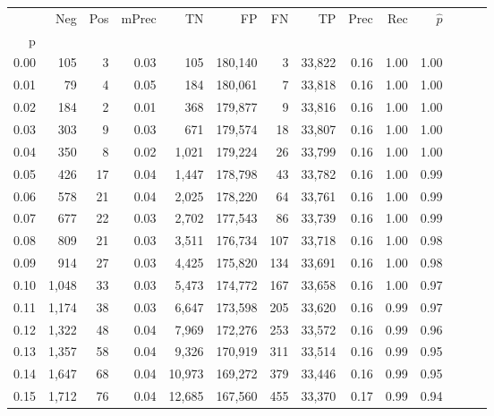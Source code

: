 \begin{tabular}{rrrrrrrrrrrrrr}
\toprule
{} &    Neg &  Pos & mPrec &       TN &       FP &      FN &      TP &  Prec &   Rec & $\hat{p}$ \\
p    &        &      &       &          &          &         &         &       &       &           \\
\midrule
0.00 &    105 &    3 &  0.03 &      105 &  180,140 &       3 &  33,822 &  0.16 &  1.00 &      1.00 \\
0.01 &     79 &    4 &  0.05 &      184 &  180,061 &       7 &  33,818 &  0.16 &  1.00 &      1.00 \\
0.02 &    184 &    2 &  0.01 &      368 &  179,877 &       9 &  33,816 &  0.16 &  1.00 &      1.00 \\
0.03 &    303 &    9 &  0.03 &      671 &  179,574 &      18 &  33,807 &  0.16 &  1.00 &      1.00 \\
0.04 &    350 &    8 &  0.02 &    1,021 &  179,224 &      26 &  33,799 &  0.16 &  1.00 &      1.00 \\
0.05 &    426 &   17 &  0.04 &    1,447 &  178,798 &      43 &  33,782 &  0.16 &  1.00 &      0.99 \\
0.06 &    578 &   21 &  0.04 &    2,025 &  178,220 &      64 &  33,761 &  0.16 &  1.00 &      0.99 \\
0.07 &    677 &   22 &  0.03 &    2,702 &  177,543 &      86 &  33,739 &  0.16 &  1.00 &      0.99 \\
0.08 &    809 &   21 &  0.03 &    3,511 &  176,734 &     107 &  33,718 &  0.16 &  1.00 &      0.98 \\
0.09 &    914 &   27 &  0.03 &    4,425 &  175,820 &     134 &  33,691 &  0.16 &  1.00 &      0.98 \\
0.10 &  1,048 &   33 &  0.03 &    5,473 &  174,772 &     167 &  33,658 &  0.16 &  1.00 &      0.97 \\
0.11 &  1,174 &   38 &  0.03 &    6,647 &  173,598 &     205 &  33,620 &  0.16 &  0.99 &      0.97 \\
0.12 &  1,322 &   48 &  0.04 &    7,969 &  172,276 &     253 &  33,572 &  0.16 &  0.99 &      0.96 \\
0.13 &  1,357 &   58 &  0.04 &    9,326 &  170,919 &     311 &  33,514 &  0.16 &  0.99 &      0.95 \\
0.14 &  1,647 &   68 &  0.04 &   10,973 &  169,272 &     379 &  33,446 &  0.16 &  0.99 &      0.95 \\
0.15 &  1,712 &   76 &  0.04 &   12,685 &  167,560 &     455 &  33,370 &  0.17 &  0.99 &      0.94 \\

\end{tabular}
